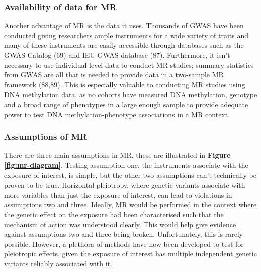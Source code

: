 \documentclass[11pt,twoside]{bristolthesis}
\begin{document}
\hypertarget{availability-of-data-for-mr}{%
\subsubsection{Availability of data for MR}\label{availability-of-data-for-mr}}

Another advantage of MR is the data it uses. Thousands of GWAS have been conducted giving researchers ample instruments for a wide variety of traits and many of these instruments are easily accessible through databases such as the GWAS Catalog (69) and IEU GWAS database (87). Furthermore, it isn't necessary to use individual-level data to conduct MR studies; summary statistics from GWAS are all that is needed to provide data in a two-sample MR framework (88,89). This is especially valuable to conducting MR studies using DNA methylation data, as no cohorts have measured DNA methylation, genotype and a broad range of phenotypes in a large enough sample to provide adequate power to test DNA methylation-phenotype associations in a MR context.

\hypertarget{assumptions-of-mr}{%
\subsubsection{Assumptions of MR}\label{assumptions-of-mr}}

There are three main assumptions in MR, these are illustrated in \textbf{Figure \ref{fig:mr-diagram}}. Testing assumption one, the instruments associate with the exposure of interest, is simple, but the other two assumptions can't technically be proven to be true. Horizontal pleiotropy, where genetic variants associate with more variables than just the exposure of interest, can lead to violations in assumptions two and three. Ideally, MR would be performed in the context where the genetic effect on the exposure had been characterised such that the mechanism of action was understood clearly. This would help give evidence against assumptions two and three being broken. Unfortunately, this is rarely possible. However, a plethora of methods have now been developed to test for pleiotropic effects, given the exposure of interest has multiple independent genetic variants reliably associated with it.
\end{document}

